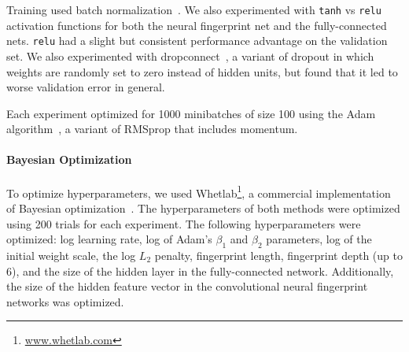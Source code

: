 \documentclass{article}
\begin{document}
Training used batch normalization~\citep{ioffe2015batch}.
We also experimented with \texttt{tanh} vs \texttt{relu} activation functions for both the neural fingerprint net and the fully-connected nets.
\texttt{relu} had a slight but consistent performance advantage on the validation set.
We also experimented with dropconnect~\citep{wan2013regularization}, a variant of dropout in which weights are randomly set to zero instead of hidden units, but found that it led to worse validation error in general.

Each experiment optimized for 1000 minibatches of size 100 using the Adam algorithm~\citep{Adam14}, a variant of RMSprop that includes momentum.

\paragraph{Bayesian Optimization}
To optimize hyperparameters, we used {\sc Whetlab}\footnote{\url{www.whetlab.com}}, a commercial implementation of Bayesian optimization~\citep{snoek2012practical}.
The hyperparameters of both methods were optimized using 200 trials for each experiment.
The following hyperparameters were optimized: log learning rate, log of Adam's $\beta_1$ and $\beta_2$ parameters, log of the initial weight scale, the log $L_2$ penalty, fingerprint length, fingerprint depth (up to 6), and the size of the hidden layer in the fully-connected network.
Additionally, the size of the hidden feature vector in the convolutional neural fingerprint networks was optimized.
\end{document}
